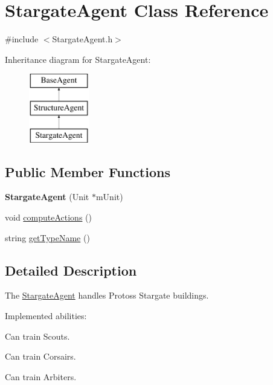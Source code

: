 \hypertarget{class_stargate_agent}{
\section{StargateAgent Class Reference}
\label{class_stargate_agent}
}


{\ttfamily \#include $<$StargateAgent.h$>$}

Inheritance diagram for StargateAgent:\begin{figure}[H]
\begin{center}
\leavevmode
\includegraphics[height=3.000000cm]{class_stargate_agent}
\end{center}
\end{figure}
\subsection*{Public Member Functions}
\begin{DoxyCompactItemize}
\item 
\hypertarget{class_stargate_agent_ab2af86492670119dac54c68c05a4bb71}{
{\bfseries StargateAgent} (Unit $\ast$mUnit)}
\label{class_stargate_agent_ab2af86492670119dac54c68c05a4bb71}

\item 
void \hyperlink{class_stargate_agent_a79107dd5186ecfe294efc5f75b166aeb}{computeActions} ()
\item 
string \hyperlink{class_stargate_agent_a2f09834418356f02f8a39a7083ec3eaa}{getTypeName} ()
\end{DoxyCompactItemize}


\subsection{Detailed Description}
The \hyperlink{class_stargate_agent}{StargateAgent} handles Protoss Stargate buildings.

Implemented abilities:
\begin{DoxyItemize}
\item Can train Scouts.
\item Can train Corsairs.
\item Can train Arbiters.
\end{DoxyItemize}

